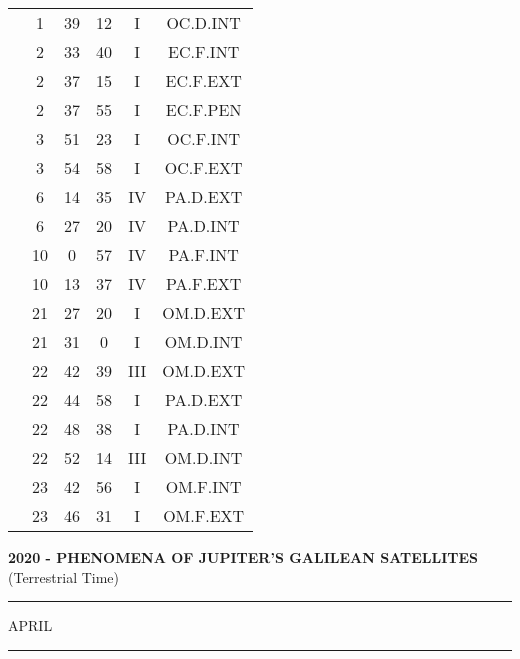 \documentclass[12pt, a4paper]{article}
\begin{document}
\begin{multicols}{3}
{\begin{tabular}{c c c c c c}
	 	 	 	 & 1 & 39 & 12 & I & OC.D.INT\\%
	 	 	 	 & 2 & 33 & 40 & I & EC.F.INT\\%
	 	 	 	 & 2 & 37 & 15 & I & EC.F.EXT\\%
	 	 	 	 & 2 & 37 & 55 & I & EC.F.PEN\\%
	 	 	 	 & 3 & 51 & 23 & I & OC.F.INT\\%
	 	 	 	 & 3 & 54 & 58 & I & OC.F.EXT\\%
	 	 	 	 & 6 & 14 & 35 & IV & PA.D.EXT\\%
	 	 	 	 & 6 & 27 & 20 & IV & PA.D.INT\\%
	 	 	 	 & 10 & 0 & 57 & IV & PA.F.INT\\%
	 	 	 	 & 10 & 13 & 37 & IV & PA.F.EXT\\%
	 	 	 	 & 21 & 27 & 20 & I & OM.D.EXT\\%
	 	 	 	 & 21 & 31 & 0 & I & OM.D.INT\\%
	 	 	 	 & 22 & 42 & 39 & III & OM.D.EXT\\%
	 	 	 	 & 22 & 44 & 58 & I & PA.D.EXT\\%
	 	 	 	 & 22 & 48 & 38 & I & PA.D.INT\\%
	 	 	 	 & 22 & 52 & 14 & III & OM.D.INT\\%
	 	 	 	 & 23 & 42 & 56 & I & OM.F.INT\\%
	 	 	 	 & 23 & 46 & 31 & I & OM.F.EXT\\%
	 	 \end{tabular}
 	}
\end{multicols}
\textbf{2020 - PHENOMENA OF JUPITER'S GALILEAN SATELLITES}\\(Terrestrial Time) 
\vspace{0.1cm} \hrule \vspace{0.1cm}
APRIL\vspace{0.1cm}
\hrule
\vspace{-0.2cm}
\end{document}
